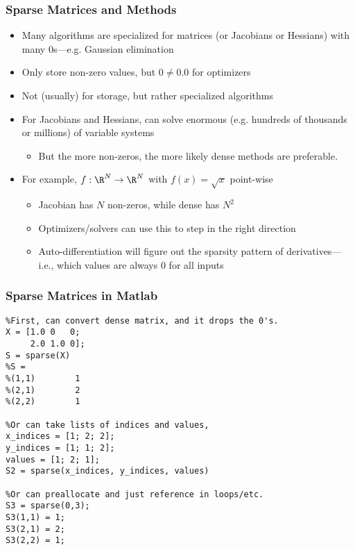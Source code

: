 \documentclass[nofootline]{etk-presentation}
\begin{document}
\begin{frame}[fragile]	\frametitle{Sparse Matrices and Methods}
	\begin{itemize}
		\item Many algorithms are specialized for matrices (or Jacobians or Hessians) with many $0$s---e.g. Gaussian elimination
		\item  Only store non-zero values, but $0 \neq 0.0$ for optimizers
		\item Not (usually) for storage, but rather specialized algorithms
		\item For Jacobians and Hessians, can solve enormous (e.g. hundreds of thousands or millions) of variable systems
		\begin{itemize}
			\item But the more non-zeros, the more likely dense methods are preferable.
		\end{itemize}

				\item For example, $f: \R^N \to \R^N$ with $f(x) = \sqrt{x}$ point-wise
				\begin{itemize}
					\item Jacobian has $N$ non-zeros, while dense has $N^2$
					\item Optimizers/solvers can use this to step in the right direction
					\item Auto-differentiation will figure out the sparsity pattern of derivatives---i.e., which values are always $0$ for all inputs
				\end{itemize}
	\end{itemize}
\end{frame}


\begin{frame}[fragile] \frametitle{Sparse Matrices in Matlab}
	\begin{verbatim}
%First, can convert dense matrix, and it drops the 0's.
X = [1.0 0   0;
     2.0 1.0 0];
S = sparse(X)
%S =
%(1,1)        1
%(2,1)        2
%(2,2)        1

%Or can take lists of indices and values,
x_indices = [1; 2; 2];
y_indices = [1; 1; 2];
values = [1; 2; 1];
S2 = sparse(x_indices, y_indices, values)

%Or can preallocate and just reference in loops/etc.
S3 = sparse(0,3);
S3(1,1) = 1;
S3(2,1) = 2;
S3(2,2) = 1;
	\end{verbatim}
\end{frame}

\begin{frame}\frametitle{}
	\bigskip
	\bigskip
	\bigskip	
	\begin{center}
		{\huge {}}
	\end{center}
\end{frame}
\end{document}
